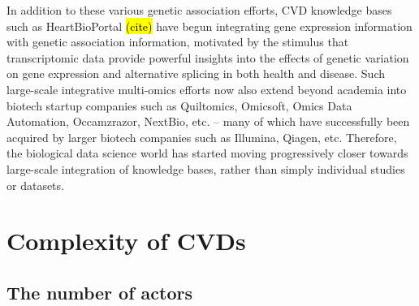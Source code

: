 \documentclass[letter]{bioinfo}
\begin{document}
	In addition to these various genetic association efforts, CVD knowledge bases such as HeartBioPortal \hl{(cite)} have begun integrating gene expression information with genetic association information, motivated by the stimulus that transcriptomic data provide powerful insights into the effects of genetic variation on gene expression and alternative splicing in both health and disease.  Such large-scale integrative multi-omics efforts now also extend beyond academia into biotech startup companies such as Quiltomics, Omicsoft, Omics Data Automation, Occamzrazor, NextBio, etc. -- many of which have successfully been acquired by larger biotech companies such as Illumina, Qiagen, etc.  Therefore, the biological data science world has started moving progressively closer towards large-scale integration of knowledge bases, rather than simply individual studies or datasets.    
	
	
	\section*{Complexity of CVDs}  %
	\subsection*{The number of actors}
	
\end{document}
